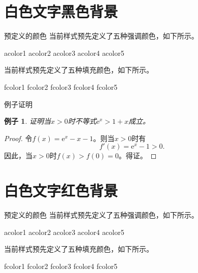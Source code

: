 \documentclass[14pt,notheorems,xcolor={rgb}]{beamer}
\newtheorem{example}[theorem]{例子}
\begin{document}

\begin{frame}[plain]\transboxout
\titlepage
\end{frame}

\section{白色文字黑色背景}

\begin{frame}{预定义的颜色}
当前样式预先定义了五种强调颜色，如下所示。
\begin{flushleft}
\textcolor{acolor1}{acolor1}
\textcolor{acolor2}{acolor2}
\textcolor{acolor3}{acolor3}
\textcolor{acolor4}{acolor4}
\textcolor{acolor5}{acolor5}
\end{flushleft}
当前样式预先定义了五种填充颜色，如下所示。
\begin{flushleft}
\colorbox{fcolor1}{fcolor1}
\colorbox{fcolor2}{fcolor2}
\colorbox{fcolor3}{fcolor3}
\colorbox{fcolor4}{fcolor4}
\colorbox{fcolor5}{fcolor5}
\end{flushleft}
\end{frame}

\begin{frame}{例子证明}
\begin{example}
证明当$x>0$时不等式$\mathrm{e}^x>1+x$成立。
\end{example}\pause
\begin{proof}
令$f(x)=\mathrm{e}^x-x-1$。则当$x>0$时有
$$f'(x)=\mathrm{e}^x-1>0.$$
因此，当$x>0$时$f(x)>f(0)=0$。得证。
\end{proof}
\end{frame}


\begin{frame}[plain]\transboxout
\titlepage
\end{frame}

\section{白色文字红色背景}

\begin{frame}{预定义的颜色}
当前样式预先定义了五种强调颜色，如下所示。
\begin{flushleft}
\textcolor{acolor1}{acolor1}
\textcolor{acolor2}{acolor2}
\textcolor{acolor3}{acolor3}
\textcolor{acolor4}{acolor4}
\textcolor{acolor5}{acolor5}
\end{flushleft}
当前样式预先定义了五种填充颜色，如下所示。
\begin{flushleft}
\colorbox{fcolor1}{fcolor1}
\colorbox{fcolor2}{fcolor2}
\colorbox{fcolor3}{fcolor3}
\colorbox{fcolor4}{fcolor4}
\colorbox{fcolor5}{fcolor5}
\end{flushleft}
\end{frame}
\end{document}
